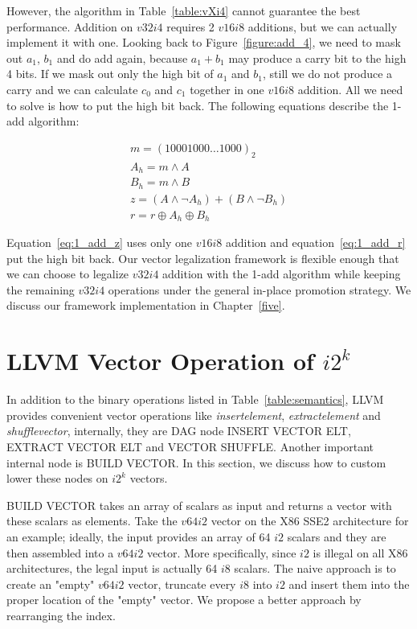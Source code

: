 However, the algorithm in Table~\ref{table:vXi4} cannot guarantee the best performance. Addition on $v32i4$ requires 2 $v16i8$ additions, but we can actually implement it with one. Looking back to Figure~\ref{figure:add_4}, we need to mask out $a_1$, $b_1$ and do add again, because $a_1 + b_1$ may produce a carry bit to the high 4 bits. If we mask out only the high bit of $a_1$ and $b_1$, still we do not produce a carry and we can calculate $c_0$ and $c_1$ together in one $v16i8$ addition. All we need to solve is how to put the high bit back. The following equations describe the 1-add algorithm:

\begin{gather}
  m = (10001000 \ldots 1000)_2 \\
  A_h = m \land A \\
  B_h = m \land B \\
  z = (A \land \lnot A_h) + (B \land \lnot B_h) \label{eq:1_add_z}\\
  r = r \oplus A_h \oplus B_h \label{eq:1_add_r}
\end{gather}

Equation~\eqref{eq:1_add_z} uses only one $v16i8$ addition and equation~\eqref{eq:1_add_r} put the high bit back. Our vector legalization framework is flexible enough that we can choose to legalize $v32i4$ addition with the 1-add algorithm while keeping the remaining $v32i4$ operations under the general in-place promotion strategy. We discuss our framework implementation in Chapter~\ref{five}.

\section{LLVM Vector Operation of $i2^k$}
In addition to the binary operations listed in Table~\ref{table:semantics}, LLVM provides convenient vector operations like \textit{insertelement}, \textit{extractelement} and \textit{shufflevector}, internally, they are DAG node INSERT VECTOR ELT, EXTRACT VECTOR ELT and VECTOR SHUFFLE\@. Another important internal node is BUILD VECTOR\@. In this section, we discuss how to custom lower these nodes on $i2^k$ vectors.

BUILD VECTOR takes an array of scalars as input and returns a vector with these scalars as elements. Take the $v64i2$ vector on the X86 SSE2 architecture for an example; ideally, the input provides an array of 64 $i2$ scalars and they are then assembled into a $v64i2$ vector. More specifically, since $i2$ is illegal on all X86 architectures, the legal input is actually 64 $i8$ scalars. The naive approach is to create an "empty" $v64i2$ vector, truncate every $i8$ into $i2$ and insert them into the proper location of the "empty" vector. We propose a better approach by rearranging the index.


